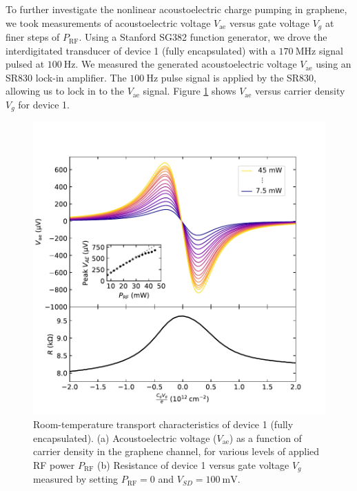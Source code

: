 \documentclass[double,12pt,1in,seploa]{beavtex}
\begin{document}
To further investigate the nonlinear acoustoelectric charge pumping in graphene, we took measurements of acoustoelectric voltage $V_{\mathrm{ae}}$ versus gate voltage $V_g$ at finer steps of $P_{\mathrm{RF}}$. Using a Stanford SG382 function generator, we drove the interdigitated transducer of device 1 (fully encapsulated) with a $\SI{170}{\mega\hertz}$ signal pulsed at $\SI{100}{\hertz}$. We measured the generated acoustoelectric voltage $V_{\mathrm{ae}}$ using an SR830 lock-in amplifier. The $\SI{100}{\hertz}$ pulse signal is applied by the SR830, allowing us to lock in to the $V_{\mathrm{ae}}$ signal. Figure \ref{AEV nonlinear series} shows $V_{\mathrm{ae}}$ versus carrier density $V_g$ for device 1.

\begin{figure}
    \includegraphics{AEV V3 power series plot_output.pdf}
    \caption{Room-temperature transport characteristics of device 1 (fully encapsulated). (a) Acoustoelectric voltage ($V_{\mathrm{ae}}$) as a function of carrier density in the graphene channel, for various levels of applied RF power $P_{\mathrm{RF}}$ (b) Resistance of device 1 versus gate voltage $V_g$ measured by setting $P_{\mathrm{RF}} = 0$ and $V_{SD} = \SI{100}{\milli\volt}$.}
    \label{AEV nonlinear series}
\end{figure}
\end{document}
